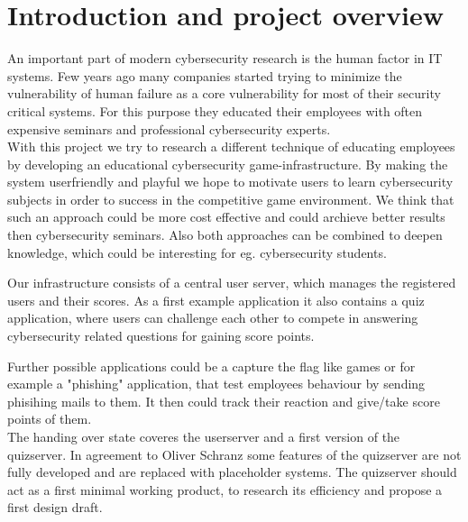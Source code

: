 \chapter{Introduction and project overview}

An important part of modern cybersecurity research is the human factor in IT systems.
Few years ago many companies started trying to minimize the vulnerability of human failure as a core vulnerability for most of their security critical systems. For this purpose they educated their employees with often expensive seminars and professional cybersecurity experts.\\

With this project we try to research a different technique of educating employees by developing an educational cybersecurity game-infrastructure. 
By making the system userfriendly and playful we hope to motivate users to learn cybersecurity subjects in order to success in the competitive game environment. We think that such an approach could be more cost effective and could archieve better results then cybersecurity seminars. Also both approaches can be combined to deepen knowledge, which could be interesting for eg. cybersecurity students. 

Our infrastructure consists of a central user server, which manages the registered users and their scores. As a first example application it also contains a quiz application, where users can challenge each other to compete in answering cybersecurity related questions for gaining score points. 

Further possible applications could be a capture the flag like games or for example a "phishing" application, that test employees behaviour by sending phisihing mails to them. It then could track their reaction and give/take score points of them.\\

The handing over state coveres the userserver and a first version of the quizserver.
In agreement to Oliver Schranz some features of the quizserver are not fully developed and are replaced with placeholder systems. The quizserver should act as a first minimal working product, to research its efficiency and propose a first design draft.